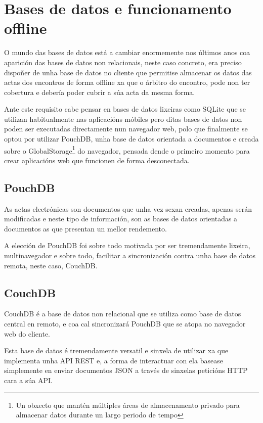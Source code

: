   \section{Bases de datos e funcionamento offline}
  \label{sec:design:db}
  O mundo das bases de datos está a cambiar enormemente nos últimos anos coa 
aparición das bases de datos non relacionais\cite{book:nosql}, neste caso 
concreto, era preciso 
dispoñer de unha base de datos no cliente que permitise almacenar os 
datos das actas dos encontros de forma offline xa que o árbitro do encontro, 
pode non ter cobertura e debería poder cubrir a súa acta da mesma forma.

  Ante este requisito cabe pensar en bases de datos lixeiras como SQLite que 
se utilizan habitualmente nas aplicacións móbiles pero ditas bases de datos non 
poden ser executadas directamente nun navegador web, polo que finalmente se 
optou por utilizar PouchDB, unha base de datos orientada a documentos e creada 
sobre o GlobalStorage\footnote{Un obxecto que mantén múltiples áreas de 
almacenamento privado para almacenar datos durante un largo periodo de tempo} 
do navegador, pensada dende o primeiro momento para crear aplicacións web que 
funcionen de forma desconectada.

    \subsection{PouchDB}
    As actas electrónicas son documentos que unha vez sexan creadas, apenas 
serán modificadas e neste tipo de información, son as bases de datos orientadas 
a documentos as que presentan un mellor rendemento.

    A elección de PouchDB\cite{web:pouchdb} foi sobre todo motivada por ser 
tremendamente lixeira, multinavegador e sobre todo, facilitar a sincronización 
contra unha base de datos remota, neste caso, CouchDB.

    \subsection{CouchDB}
    CouchDB\cite{web:couchdb} é a base de datos non relacional que se utiliza 
como base de datos central en remoto, e coa cal sincronizará PouchDB que se 
atopa no navegador web do cliente.

    Esta base de datos é tremendamente versatil e sinxela de utilizar xa que 
implementa unha API REST e, a forma de interactuar con ela basease simplemente 
en enviar documentos JSON a través de sinxelas peticións HTTP cara a súa API.

